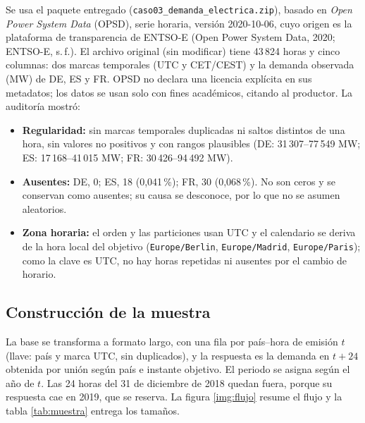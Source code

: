 Se usa el paquete entregado (\texttt{caso03\_demanda\_electrica.zip}), basado en \textit{Open Power System Data} (OPSD), serie horaria, versión 2020-10-06, cuyo origen es la plataforma de transparencia de ENTSO-E (Open Power System Data, 2020; ENTSO-E, s.\,f.). El archivo original (sin modificar) tiene 43\,824 horas y cinco columnas: dos marcas temporales (UTC y CET/CEST) y la demanda observada (MW) de DE, ES y FR. OPSD no declara una licencia explícita en sus metadatos; los datos se usan solo con fines académicos, citando al productor. La auditoría mostró:
\begin{itemize}
    \item \textbf{Regularidad:} sin marcas temporales duplicadas ni saltos distintos de una hora, sin valores no positivos y con rangos plausibles (DE: 31\,307--77\,549 MW; ES: 17\,168--41\,015 MW; FR: 30\,426--94\,492 MW).
    \item \textbf{Ausentes:} DE, 0; ES, 18 (0,041\,\%); FR, 30 (0,068\,\%). No son ceros y se conservan como ausentes; su causa se desconoce, por lo que no se asumen aleatorios.
    \item \textbf{Zona horaria:} el orden y las particiones usan UTC y el calendario se deriva de la hora local del objetivo (\texttt{Europe/Berlin}, \texttt{Europe/Madrid}, \texttt{Europe/Paris}); como la clave es UTC, no hay horas repetidas ni ausentes por el cambio de horario.
\end{itemize}

\subsection{Construcción de la muestra} \label{sec:muestra}

La base se transforma a formato largo, con una fila por país--hora de emisión $t$ (llave: país y marca UTC, sin duplicados), y la respuesta es la demanda en $t+24$ obtenida por unión según país e instante objetivo. El periodo se asigna según el año de $t$. Las 24 horas del 31 de diciembre de 2018 quedan fuera, porque su respuesta cae en 2019, que se reserva. La figura \ref{img:flujo} resume el flujo y la tabla \ref{tab:muestra} entrega los tamaños.

